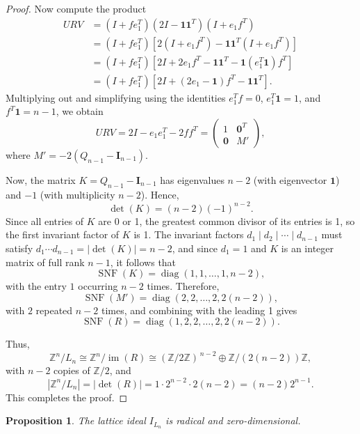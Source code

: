 \documentclass[11pt]{amsart}
\theoremstyle{plain}
\newtheorem{prop}[theorem]{Proposition}
\theoremstyle{definition}
\theoremstyle{remark}
\begin{document}
\begin{proof}
	Now compute the product
	\[
	\begin{aligned}
	URV &= (I + f e_1^T)(2I - \mathbf{1}\mathbf{1}^T)(I + e_1 f^T) \\
	&= (I + f e_1^T)\left[2(I + e_1 f^T) - \mathbf{1}\mathbf{1}^T(I + e_1 f^T)\right] \\
	&= (I + f e_1^T)\left[2I + 2e_1 f^T - \mathbf{1}\mathbf{1}^T - \mathbf{1}(e_1^T \mathbf{1}) f^T\right] \\
	&= (I + f e_1^T)\left[2I + (2e_1 - \mathbf{1})f^T - \mathbf{1}\mathbf{1}^T\right].
	\end{aligned}
	\]
	Multiplying out and simplifying using the identities \( e_1^T f = 0 \), \( e_1^T \mathbf{1} = 1 \), and \( f^T \mathbf{1} = n-1 \), we obtain
	\[
	URV = 2I - e_1 e_1^T - 2f f^T = \begin{pmatrix} 1 & \mathbf{0}^T \\ \mathbf{0} & M' \end{pmatrix},
	\]
	where \( M' = -2(Q_{n-1} - \boldsymbol{I}_{n-1}) \).
	
	Now, the matrix \( K = Q_{n-1} - \boldsymbol{I}_{n-1} \) has eigenvalues \( n-2 \) (with eigenvector \( \mathbf{1} \)) and \( -1 \) (with multiplicity \( n-2 \)). Hence,
	\[
	\det(K) = (n-2)(-1)^{n-2}.
	\]
	Since all entries of \( K \) are 0 or 1, the greatest common divisor of its entries is 1, so the first invariant factor of \( K \) is 1. The invariant factors \( d_1 \mid d_2 \mid \cdots \mid d_{n-1} \) must satisfy \( d_1 \cdots d_{n-1} = |\det(K)| = n-2 \), and since \( d_1 = 1 \) and $K$ is an integer matrix of full rank $n-1$, it follows that
	\[
	\operatorname{SNF}(K) = \operatorname{diag}(1, 1, \dots, 1, n-2),
	\]
	with the entry \(1\) occurring \( n-2 \) times. Therefore,
	\[
	\operatorname{SNF}(M') = \operatorname{diag}(2, 2, \dots, 2, 2(n-2)),
	\]
	with \( 2 \) repeated \(n - 2\) times, and combining with the leading 1 gives
	\[
	\operatorname{SNF}(R) = \operatorname{diag}(1, 2, 2, \dots, 2, 2(n-2)).
	\]
	
	Thus,
	\[
	\mathbb{Z}^n / L_n \cong \mathbb Z^n /  \operatorname{im}(R) \cong (\mathbb Z/2 \mathbb Z)^{\,n-2}  \oplus \mathbb{Z}/(2(n-2))\mathbb Z,
	\]
	with \( n-2 \) copies of \( \mathbb{Z}/2 \), and
	\[
	|\mathbb{Z}^n / L_n| = |\det(R)| = 1 \cdot 2^{n-2} \cdot 2(n-2) = (n-2)2^{n-1}.
	\]
	This completes the proof. 
	
\end{proof}


\begin{prop}
	\label{prop:radical_ILn}
	The lattice ideal \(I_{L_n} \) is radical and zero-dimensional. 
\end{prop}
\end{document}
